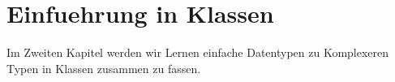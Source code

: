 \chapter{Einfuehrung in Klassen}
\pagestyle{empty}

Im Zweiten Kapitel werden wir Lernen einfache Datentypen zu Komplexeren Typen in Klassen zusammen zu fassen.






\pagestyle{empty}
